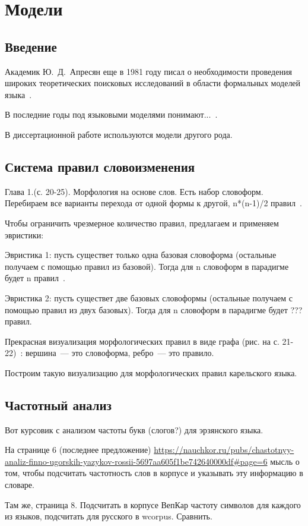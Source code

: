 \chapter{Модели} \label{chapt_models}

\section{Введение} \label{sect_model_intro}
Академик Ю.~Д.~Апресян еще в 1981 году писал о необходимости проведения широких теоретических поисковых исследований в области формальных моделей языка~\cite{Apresjan1981}.

В последние годы под языковыми моделями понимают...~\cite{Petroni2019}. 

В диссертационной работе используются модели другого рода.



\section{Система правил словоизменения} \label{sect_rules_flextion}

Глава 1.(с. 20-25). Морфология на основе слов. Есть набор словоформ. 
Перебираем все варианты перехода 
от одной формы к другой, n*(n-1)/2 правил~\cite[20--25]{Albright2002stem}.

Чтобы ограничить чрезмерное количество правил, предлагаем и применяем эвристики:

Эвристика 1: пусть существет только одна базовая словоформа 
(остальные получаем с помощью правил из базовой). 
Тогда для n словоформ в парадигме будет n правил~\cite{Albright2002stem}.

Эвристика 2: пусть существет две базовых словоформы 
(остальные получаем с помощью правил из двух базовых). 
Тогда для n словоформ в парадигме будет ??? правил.

Прекрасная визуализация морфологических правил в виде графа 
(рис. на с. 21-22)~\cite[21--22]{Albright2002stem}: 
вершина~--- это словоформа, ребро~--- это правило.

Построим такую визуализацию для морфологических правил карельского языка. 




\section{Частотный анализ} \label{sect_freq}


Вот курсовик с анализом частоты букв (слогов?) для эрзянского языка.

На странице 6 (последнее предложение)
\url{https://nauchkor.ru/pubs/chastotnyy-analiz-finno-ugorskih-yazykov-rossii-5697aa605f1be742640000df#page=6}
мысль о том, чтобы подсчитать частотность слов в корпусе и указывать эту информацию в словаре.

Там же, страница 8. Подсчитать в корпусе ВепКар частоту символов для каждого из языков, 
подсчитать для русского в wcorpus. Сравнить.

 

